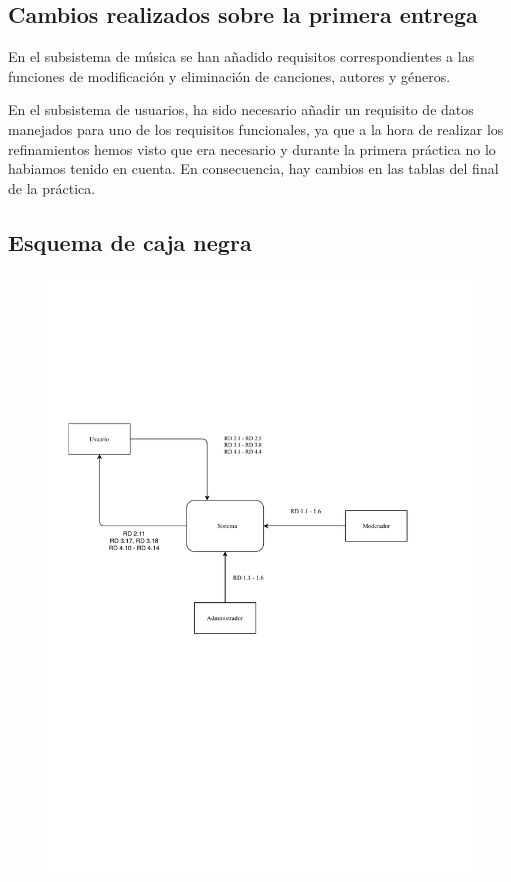 \subsection{Cambios realizados sobre la primera entrega}

En el subsistema de música se han añadido requisitos correspondientes a las funciones de modificación y eliminación de canciones, autores y géneros.

En el subsistema de usuarios, ha sido necesario añadir un requisito de datos manejados para uno de los requisitos funcionales, ya que a la hora de realizar los refinamientos hemos visto que era necesario y durante la primera práctica no lo habiamos tenido en cuenta. En consecuencia, hay cambios en las tablas del final de la práctica.

\subsection{Esquema de caja negra}

\begin{figure}[H]
  \centering
  \includegraphics{diagramas/Caja_negra.pdf}
\end{figure}


